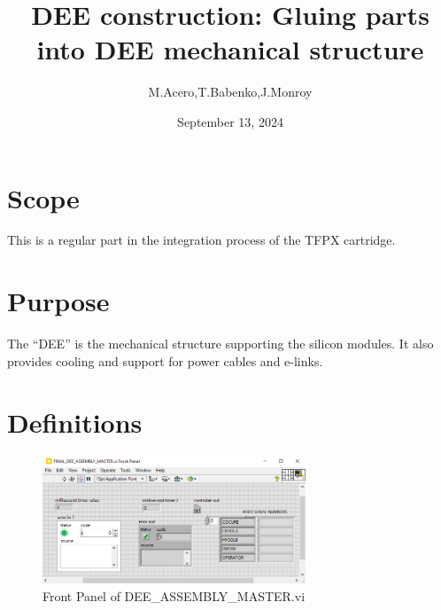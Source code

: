 \documentclass[12pt]{cornelltfpxsop}
\title{DEE construction: Gluing  parts into DEE mechanical structure}
\date{September 13, 2024}
\author{M.Acero,T.Babenko,J.Monroy}
\begin{document}
\maketitle
\section{Scope}
This is a regular part in the integration process of the TFPX cartridge.

\section{Purpose}
The ``DEE'' is the mechanical structure supporting the silicon modules. It also provides cooling and support for power cables and e-links.    

\section{Definitions}
\begin{center}
\begin{figure}[h!]
\includegraphics[width=0.7\textwidth]{img/Front_panel2.png}
\caption{Front Panel of DEE\_ASSEMBLY\_MASTER.vi}
\label{front_panel}
\end{figure}
\end{center}
\end{document}
